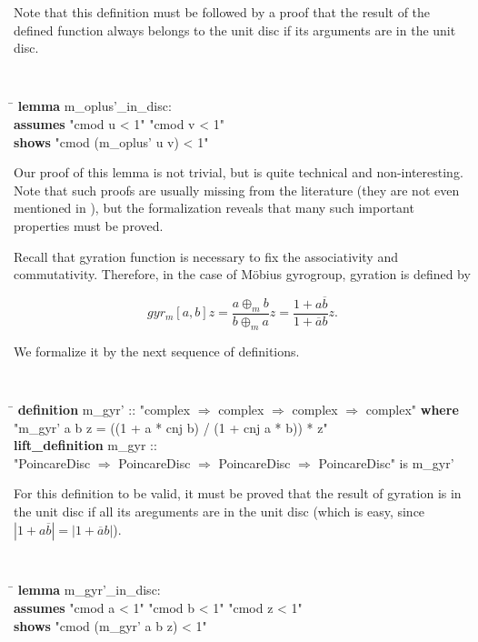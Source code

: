 \documentclass[a4paper]{article}
\theoremstyle{definition}
\begin{document}
Note that this definition must be followed by a proof that the result
of the defined function always belongs to the unit disc if its
arguments are in the unit disc.

{\tt
\begin{small}
\begin{tabbing}
\hspace{5mm}\=\kill
{\bf lemma} m\_oplus'\_in\_disc:\\
\>  {\bf assumes} "cmod u < 1" "cmod v < 1"\\
\>  {\bf shows} "cmod (m\_oplus' u v) < 1"
\end{tabbing}
\end{small}
}

Our proof of this lemma is not trivial, but is quite technical and
non-interesting. Note that such proofs are usually missing from the
literature (they are not even mentioned in \cite{ungar-analytic}), but
the formalization reveals that many such important properties must be
proved.

Recall that gyration function is necessary to fix the associativity
and commutativity. Therefore, in the case of M\"obius gyrogroup,
gyration is defined by

$$gyr_m[a, b] z = \frac{a\oplus_m b}{b\oplus_m a}z = \frac{1 + a\overline{b}}{1+\overline{a}b}z.$$

We formalize it by the next sequence of definitions.

{\tt
\begin{small}
\begin{tabbing}
\hspace{5mm}\=\kill
{\bf definition} m\_gyr' :: "complex $\Rightarrow$ complex $\Rightarrow$ complex $\Rightarrow$ complex" {\bf where}\\
\>  "m\_gyr' a b z = ((1 + a * cnj b) / (1 + cnj a * b)) * z"\\
{\bf lift\_definition} m\_gyr ::\\
\>"PoincareDisc $\Rightarrow$ PoincareDisc $\Rightarrow$ PoincareDisc $\Rightarrow$ PoincareDisc" is m\_gyr'
\end{tabbing}
\end{small}
}

For this definition to be valid, it must be proved that the result of
gyration is in the unit disc if all its areguments are in the unit
disc (which is easy, since $|1+a\overline{b}| = |1+\overline{a}b|$).

{\tt
\begin{small}
\begin{tabbing}
\hspace{5mm}\=\kill
{\bf lemma} m\_gyr'\_in\_disc:\\
\>  {\bf assumes} "cmod a < 1" "cmod b < 1" "cmod z < 1"\\
\>  {\bf shows} "cmod (m\_gyr' a b z) < 1"
\end{tabbing}
\end{small}
}
\end{document}
